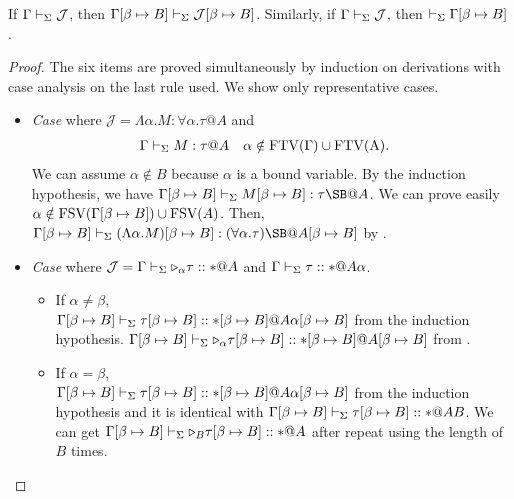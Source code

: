 
\begin{lemma}
	If $\Gamma \vdash_\Sigma \mathcal{J}$, then $\Gamma[\beta\mapsto B] \vdash_\Sigma \mathcal{J}[\beta\mapsto B]$.  Similarly, if $\Gamma \vdash_\Sigma \mathcal{J}$, then $\vdash_\Sigma \Gamma[\beta\mapsto B]$.
\end{lemma}

\begin{proof}
	The six items are proved simultaneously by induction on derivations with case analysis on the last rule used.
	We show only representative cases.
	\begin{itemize}
								
		\newcommand{\SB}{[\beta \mapsto B]}
		\newcommand{\GG}{\G\SB}
		\newcommand{\GGV}{\G\SB \V}
				
		\item \textit{Case} \TGen{} where $\mathcal{J} = \Lambda\alpha.M:\forall\alpha.\tau@A$ and
		      \begin{align*}
		      	  & \G\V M:\tau@A &   & \alpha\notin\rm{FTV}(\G)\cup\rm{FTV}(A). 
		      \end{align*}
		      We can assume $\alpha \notin B$ because $\alpha$ is a bound variable.
		      By the induction hypothesis, we have \(\G\SB\V M\SB:\tau\SB@A\).
		      We can prove easily $\alpha \notin \FTV(\GG) \cup \FTV(A)$.
		      Then, \(\GGV (\Lambda\alpha.M)\SB:(\forall\alpha.\tau)\SB@A\SB\) by \TGen.
		      		      
		\item \textit{Case} \KTW{} where \(\mathcal{J} = \Gamma\vdash_\Sigma {\mathop{\triangleright}}_\alpha \tau :: * @ A \) and \( \Gamma\vdash_\Sigma \tau :: * @ A\alpha \).
		      \begin{itemize}
		      	\item If $\alpha \neq \beta$,\\
		      	      \( \GGV \tau\SB :: *\SB @ A\alpha\SB \) from the induction hypothesis.
		      	      \( \GGV \TW_\alpha \tau\SB :: *\SB @ A\SB \) from \KTW.
		      	      	      	      	      	      	      	      	      	      	     	      
		      	\item If $\alpha = \beta$, \\
		      	      \( \GGV \tau\SB :: *\SB @ A\alpha\SB \) from the induction hypothesis and
		      	      it is identical with \( \GGV \tau\SB :: * @ AB \).
		      	      We can get \( \GGV \TW_B \tau\SB :: * @ A \) after repeat using \KTW{} the length of $B$ times.
		      	      

\end{itemize}
\end{itemize}
\end{proof}
